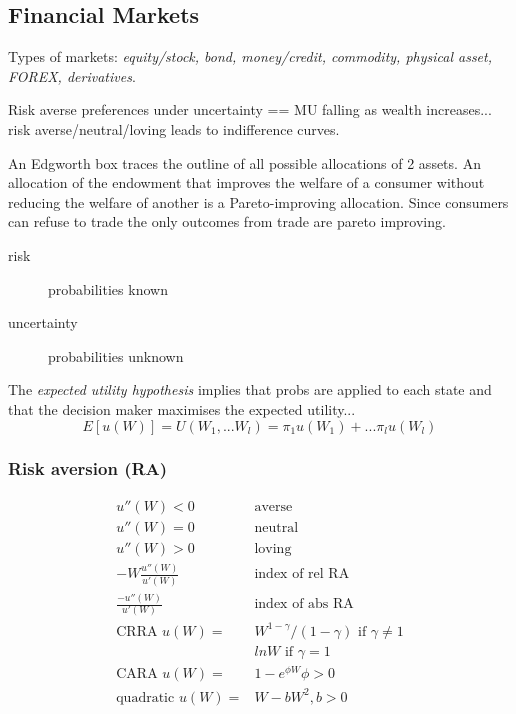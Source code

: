 \documentclass[a4paper,12pt]{article}
\begin{document}
\begin{multicols}{2}



\clearpage
\subsection*{Financial Markets}
Types of markets: \emph{equity/stock, bond, money/credit, commodity, physical
asset, FOREX, derivatives}.

Risk averse preferences under uncertainty == MU falling as wealth increases...
risk averse/neutral/loving leads to indifference curves.

An Edgworth box traces the outline of all possible allocations of 2 assets. An
allocation of the endowment that improves the welfare of a consumer without
reducing the welfare of another is a Pareto-improving allocation. Since
consumers can refuse to trade the only outcomes from trade are pareto
improving. 

\begin{description}
\item[risk] probabilities known
\item[uncertainty] probabilities unknown
\end{description}
The \emph{expected utility hypothesis} implies that probs are applied to each
state and that the decision maker maximises the expected utility...
\[E[u(W)]=U(W_1,...W_l)=\pi_1u(W_1)+...\pi_lu(W_l)\]
\subsubsection*{Risk aversion (RA)}
\[
\begin{array}{rl}
u''(W) < 0 &\mbox{averse}\\
u''(W) = 0 &\mbox{neutral}\\
u''(W) > 0 &\mbox{loving}\\
-W\frac{u''(W)}{u'(W)} &\mbox{index of rel RA}\\
\frac{-u''(W)}{u'(W)} &\mbox{index of abs RA}\\
\mbox{CRRA }u(W) =  &W^{1-\gamma}/(1-\gamma) \mbox{ if } \gamma \ne 1\\
                    &lnW \mbox{ if } \gamma = 1\\
\mbox{CARA }u(W) =& 1-e^{\phi W} \phi > 0\\
\mbox{quadratic }u(W) =&W - bW^2, b>0\\
\end{array}
\]


\end{multicols}
\end{document}
